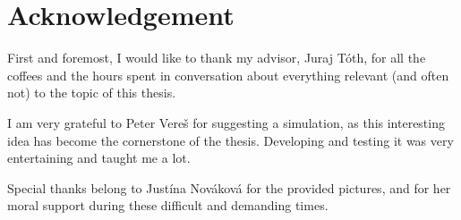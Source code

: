 \section*{Acknowledgement}
    First and foremost, I would like to thank my advisor, Juraj Tóth, for all the coffees and the hours spent in conversation
    about everything relevant (and often not) to the topic of this thesis.

    I am very grateful to Peter Vereš for suggesting a simulation, as this interesting idea has become the
    cornerstone of the thesis. Developing and testing it was very entertaining and taught me a lot.

    Special thanks belong to Justína Nováková for the provided pictures, and for her moral support
    during these difficult and demanding times.
